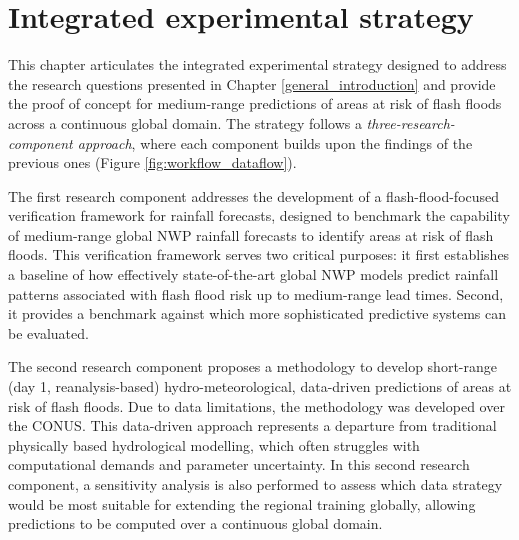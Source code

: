 \chapter{Integrated experimental strategy}
\label{experimental_design}
\graphicspath{{chapter_03/figures}{chapter_03/tables}}


This chapter articulates the integrated experimental strategy designed to address the research questions presented in Chapter \ref{general_introduction} and provide the proof of concept for medium-range predictions of areas at risk of flash floods across a continuous global domain. The strategy follows a \textit{three-research-component approach}, where each component builds upon the findings of the previous ones (Figure \ref{fig:workflow_dataflow}). 

The  first research component addresses the development of a flash-flood-focused verification framework for rainfall forecasts, designed to benchmark the capability of medium-range global NWP rainfall forecasts to identify areas at risk of flash floods. This verification framework serves two critical purposes: it first establishes a baseline of how effectively state-of-the-art global NWP models predict rainfall patterns associated with flash flood risk up to medium-range lead times. Second, it provides a benchmark against which more sophisticated predictive systems can be evaluated.

The  second research component proposes a methodology to develop short-range (day 1, reanalysis-based) hydro-meteorological, data-driven predictions of areas at risk of flash floods. Due to data limitations, the methodology was developed over the CONUS. This data-driven approach represents a departure from traditional physically based hydrological modelling, which often struggles with computational demands and parameter uncertainty. In this second research component, a sensitivity analysis is also performed to assess which data strategy would be most suitable for extending the regional training globally, allowing predictions to be computed over a continuous global domain.


